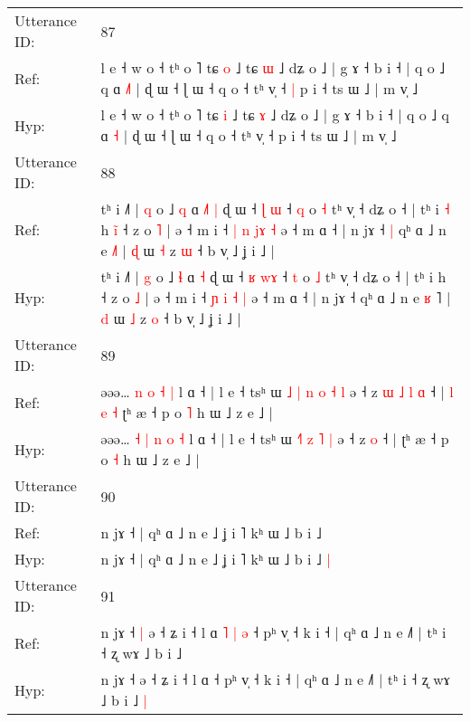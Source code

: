 \documentclass[10pt]{article}
\DeclareRobustCommand{\hl}[1]{{\textcolor{red}{#1}}}
\begin{document}
\begin{longtable}{ll}
 \\
\midrule
Utterance ID: & 87 \\
Ref: & l e ˧ w o ˧ tʰ o ˥ tɕ \hl{o} ˩ tɕ \hl{ɯ} ˩ dʑ o ˩ | g ɤ ˧ b i ˧ | q o ˩ q ɑ \hl{˩}\hl{˥} | ɖ ɯ ˧ ɭ ɯ ˧ q o ˧ tʰ v̩ ˧\hl{ }\hl{|} p i ˧ ts ɯ ˩ | m v̩ ˩
 \\
Hyp: & l e ˧ w o ˧ tʰ o ˥ tɕ \hl{i} ˩ tɕ \hl{ɤ} ˩ dʑ o ˩ | g ɤ ˧ b i ˧ | q o ˩ q ɑ \hl{}\hl{˧} | ɖ ɯ ˧ ɭ ɯ ˧ q o ˧ tʰ v̩ ˧\hl{}\hl{} p i ˧ ts ɯ ˩ | m v̩ ˩
 \\
\midrule
Utterance ID: & 88 \\
Ref: & tʰ i ˩˥ | \hl{q} o ˩ \hl{q} ɑ\hl{ }\hl{˩}\hl{˥} \hl{|} ɖ ɯ ˧ \hl{ɭ} \hl{}\hl{ɯ} ˧ \hl{q} o \hl{˧} tʰ v̩ ˧ dʑ o ˧ | tʰ i\hl{ }\hl{˧} h\hl{ }\hl{i}\hl{̃} ˧ z o \hl{˥} | ə ˧ m i ˧ \hl{|} \hl{n} \hl{j}\hl{ɤ} \hl{˧} ə ˧ m ɑ ˧ | n jɤ ˧\hl{ }\hl{|} qʰ ɑ ˩ n e \hl{}\hl{˩}˥ | \hl{ɖ} ɯ \hl{˧} z \hl{ɯ} ˧ b v̩ ˩ ʝ i ˩ |
 \\
Hyp: & tʰ i ˩˥ | \hl{g} o ˩ \hl{ɬ} ɑ\hl{}\hl{}\hl{} \hl{˧} ɖ ɯ ˧ \hl{ʁ} \hl{w}\hl{ɤ} ˧ \hl{t} o \hl{˩} tʰ v̩ ˧ dʑ o ˧ | tʰ i\hl{}\hl{} h\hl{}\hl{}\hl{} ˧ z o \hl{˩} | ə ˧ m i ˧ \hl{ɲ} \hl{i} \hl{}\hl{˧} \hl{|} ə ˧ m ɑ ˧ | n jɤ ˧\hl{}\hl{} qʰ ɑ ˩ n e \hl{ʁ}\hl{ }˥ | \hl{d} ɯ \hl{˩} z \hl{o} ˧ b v̩ ˩ ʝ i ˩ |
 \\
\midrule
Utterance ID: & 89 \\
Ref: & əəə…\hl{}\hl{} \hl{n} \hl{o} \hl{˧} \hl{|} l ɑ ˧ | l e ˧ tsʰ ɯ\hl{ }\hl{˩} \hl{|}\hl{ }\hl{n} \hl{o} \hl{˧} \hl{l} ə ˧ z\hl{ }\hl{ɯ}\hl{ }\hl{˩}\hl{ }\hl{l} \hl{ɑ} ˧ |\hl{ }\hl{l}\hl{ }\hl{e}\hl{ }\hl{˧} ʈʰ æ ˧ p o \hl{˥} h ɯ ˩ z e ˩ |
 \\
Hyp: & əəə…\hl{ }\hl{˧} \hl{|} \hl{n} \hl{o} \hl{˧} l ɑ ˧ | l e ˧ tsʰ ɯ\hl{}\hl{} \hl{}\hl{˧}\hl{˥} \hl{z} \hl{˥} \hl{|} ə ˧ z\hl{}\hl{}\hl{}\hl{}\hl{}\hl{} \hl{o} ˧ |\hl{}\hl{}\hl{}\hl{}\hl{}\hl{} ʈʰ æ ˧ p o \hl{˧} h ɯ ˩ z e ˩ |
 \\
\midrule
Utterance ID: & 90 \\
Ref: & n jɤ ˧ | qʰ ɑ ˩ n e ˩ ʝ i ˥ kʰ ɯ ˩ b i ˩\hl{}\hl{}
 \\
Hyp: & n jɤ ˧ | qʰ ɑ ˩ n e ˩ ʝ i ˥ kʰ ɯ ˩ b i ˩\hl{ }\hl{|}
 \\
\midrule
Utterance ID: & 91 \\
Ref: & n jɤ ˧\hl{ }\hl{|} ə ˧ ʑ i ˧ l ɑ\hl{ }\hl{˥}\hl{ }\hl{|}\hl{ }\hl{ə} ˧ pʰ v̩ ˧ k i ˧ | qʰ ɑ ˩ n e ˩˥ | tʰ i ˧ ʐ wɤ ˩ b i ˩\hl{}\hl{}
 \\
Hyp: & n jɤ ˧\hl{}\hl{} ə ˧ ʑ i ˧ l ɑ\hl{}\hl{}\hl{}\hl{}\hl{}\hl{} ˧ pʰ v̩ ˧ k i ˧ | qʰ ɑ ˩ n e ˩˥ | tʰ i ˧ ʐ wɤ ˩ b i ˩\hl{ }\hl{|}
 \\

\end{longtable}
\end{document}
